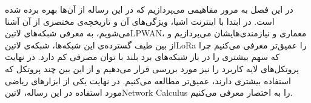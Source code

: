 
در این فصل به مرور مفاهیمی می‌پردازیم که در این رساله از آن‌ها بهره برده شده است. در ابتدا با اینترنت اشیا، ویژگی‌های آن و تاریخچه‌ی مختصری از آن آشنا می‌شویم،
به معرفی شبکه‌های ‌لاتین{LPWAN}، معماری و نیازمندی‌هایشان
می‌پردازیم و از بین طیف گسترده‌ی این شبکه‌ها، شبکه‌ی ‌لاتین{LoRa} را عمیق‌تر
معرفی می‌کنیم چرا که سهم بیشتری را در باز شبکه‌های برد بلند با توان مصرفی کم دارد.
در نهایت پروتکل‌های لایه کاربرد را نیز مورد بررسی قرار می‌دهیم و از این بین چند پروتکل که استفاده بیشتری دارند، عمیق‌تر مطالعه می‌کنیم.
در نهایت یکی از ابزارهای ریاضی مورد استفاده در این رساله، ‌لاتین{Network Calculus} را به اختصار معرفی می‌کنیم.










